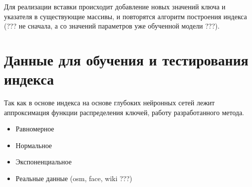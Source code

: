 
Для реализации вставки происходит добавление новых значений ключа и указателя в
существующие массивы, и повторятся алгоритм построения индекса (??? не сначала,
а со значений параметров уже обученной модели ???).

\section{Данные для обучения и тестирования индекса}

Так как в основе индекса на основе глубоких нейронных сетей лежит аппроксимация
функции распределения ключей, работу разработанного метода.

\begin{itemize}
    \item Равномерное
    \item Нормальное
    \item Экспоненциальное
    \item Реальные данные (osm, face, wiki ???)
\end{itemize}

